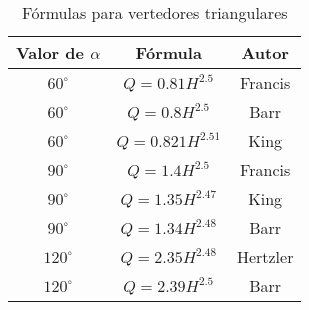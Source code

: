 \begin{table}[h!]
    \centering
    \begin{tabular}{@{}ccc@{}}
    \toprule
    Valor de $\alpha$ & Fórmula           & Autor     \\ \midrule
    $60^{\circ}$      & $Q=0.81H^{2.5}$   & Francis   \\
    $60^{\circ}$      & $Q=0.8H^{2.5}$    & Barr      \\
    $60^{\circ}$      & $Q=0.821H^{2.51}$ & King      \\
    $90^{\circ}$      & $Q=1.4H^{2.5}$    & Francis   \\
    $90^{\circ}$      & $Q=1.35H^{2.47}$  & King      \\
    $90^{\circ}$      & $Q=1.34H^{2.48}$  & Barr      \\
    $120^{\circ}$     & $Q=2.35H^{2.48}$  & Hertzler \\
    $120^{\circ}$     & $Q=2.39H^{2.5}$   & Barr      \\ \bottomrule
    \end{tabular}
    \caption{Fórmulas para vertedores triangulares}
    \label{tabhb6}
\end{table}

